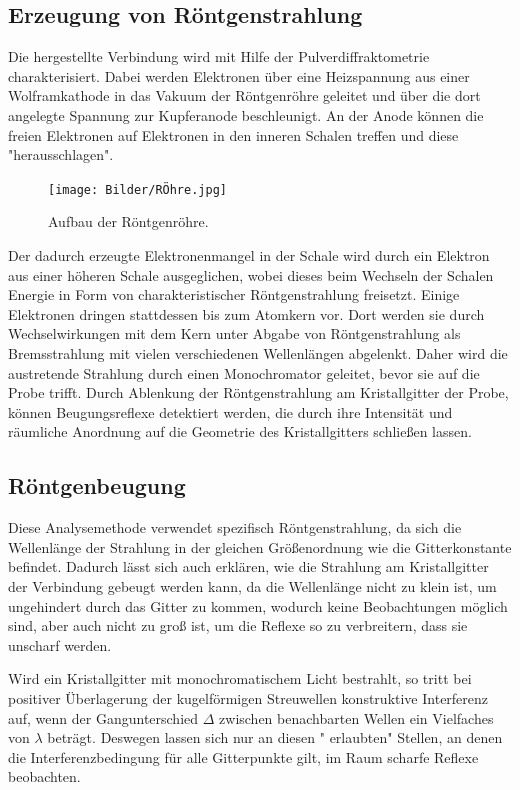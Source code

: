 \documentclass[a4paper,12pt,bibliography=totocnumbered]{scrartcl}
\begin{document}
\subsection{Erzeugung von Röntgenstrahlung}
Die hergestellte Verbindung wird mit Hilfe der Pulverdiffraktometrie charakterisiert.
Dabei werden Elektronen über eine Heizspannung aus einer Wolframkathode in das Vakuum der Röntgenröhre geleitet und über die dort angelegte Spannung zur Kupferanode beschleunigt. 
An der Anode können die freien Elektronen auf Elektronen in den inneren Schalen treffen und diese "herausschlagen".
\begin{figure}[H]
    \centering
    \texttt{[image: Bilder/RÖhre.jpg]}
    \caption{Aufbau der Röntgenröhre. \cite{Kristallgitter}}
    \label{fig: Röhre}
\end{figure}
Der dadurch erzeugte Elektronenmangel in der Schale wird durch ein Elektron aus einer höheren Schale ausgeglichen, wobei dieses beim Wechseln der Schalen Energie in Form von charakteristischer Röntgenstrahlung freisetzt. 
Einige Elektronen dringen stattdessen bis zum Atomkern vor. 
Dort werden sie durch Wechselwirkungen mit dem Kern unter Abgabe von Röntgenstrahlung als Bremsstrahlung mit vielen verschiedenen Wellenlängen abgelenkt.
Daher wird die austretende Strahlung durch einen Monochromator geleitet, bevor sie auf die Probe trifft. 
Durch Ablenkung der Röntgenstrahlung am Kristallgitter der Probe, können Beugungsreflexe detektiert werden, die durch ihre Intensität und räumliche Anordnung auf die Geometrie des Kristallgitters schließen lassen.

\subsection{Röntgenbeugung}
Diese Analysemethode verwendet spezifisch Röntgenstrahlung, da sich die Wellenlänge der Strahlung in der gleichen Größenordnung wie die Gitterkonstante befindet. \cite{Kristallgitter}
Dadurch lässt sich auch erklären, wie die Strahlung am Kristallgitter der Verbindung gebeugt werden kann, da die Wellenlänge nicht zu klein ist, um ungehindert durch das Gitter zu kommen, wodurch keine Beobachtungen möglich sind, aber auch nicht zu groß ist, um die Reflexe so zu verbreitern, dass sie unscharf werden.

Wird ein Kristallgitter mit monochromatischem Licht bestrahlt, so tritt bei positiver Überlagerung der kugelförmigen Streuwellen konstruktive Interferenz auf, wenn der Gangunterschied $\Delta$ zwischen benachbarten Wellen ein Vielfaches von $\lambda$ beträgt. \cite{Kristallgitter}
Deswegen lassen sich nur an diesen " erlaubten" Stellen, an denen die Interferenzbedingung für alle Gitterpunkte gilt, im Raum scharfe Reflexe beobachten.
\end{document}
